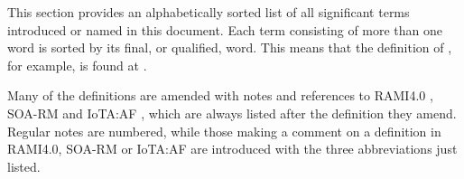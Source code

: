 %
%

This section provides an alphabetically sorted list of all significant terms introduced or named in this document.
Each term consisting of more than one word is sorted by its final, or qualified, word.
This means that the definition of , for example, is found at .

Many of the definitions are amended with notes and references to RAMI4.0 \cite{adolphs2016reference}, SOA-RM \cite{mackenzie2006reference} and IoTA:AF \cite{delsing2017iot}, which are always listed after the definition they amend.
Regular notes are numbered, while those making a comment on a definition in RAMI4.0, SOA-RM or IoTA:AF are introduced with the three abbreviations just listed.

